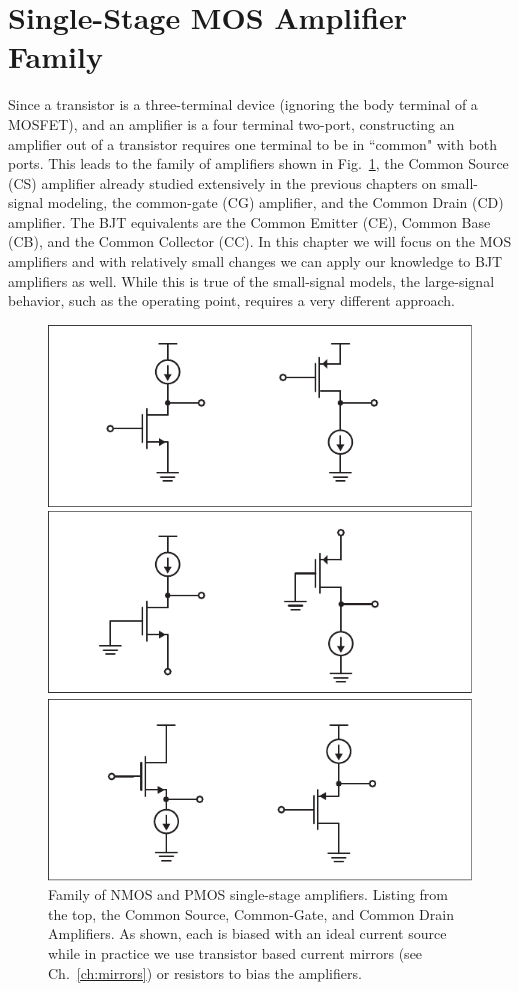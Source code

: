 \section{Single-Stage MOS Amplifier Family}
Since a transistor is a three-terminal device (ignoring the body terminal of a MOSFET), and an amplifier is a four terminal two-port, constructing an amplifier out of a transistor requires one terminal to be in ``common" with both ports.  This leads to the family of amplifiers shown in Fig.~\ref{fig:ampchart}, the Common Source (CS) amplifier already studied extensively in the previous chapters on small-signal modeling, the common-gate (CG) amplifier, and the Common Drain (CD) amplifier.  The BJT equivalents are the Common Emitter (CE), Common Base (CB), and the Common Collector (CC).  In this chapter we will focus on the MOS amplifiers and with relatively small changes we can apply our knowledge to BJT amplifiers as well.  While this is true of the small-signal models, the large-signal behavior, such as the operating point, requires a very different approach.
\begin{figure}[tb]
\begin{center}
\includegraphics[scale=.75]{ampchart}
\end{center}
\caption{Family of NMOS and PMOS single-stage amplifiers.  Listing from the top, the Common Source, Common-Gate, and Common Drain Amplifiers.  As shown, each is biased with an ideal current source while in practice we use transistor based current mirrors (see Ch.~\ref{ch:mirrors}) or resistors to bias the amplifiers.}
\label{fig:ampchart}
\end{figure}
